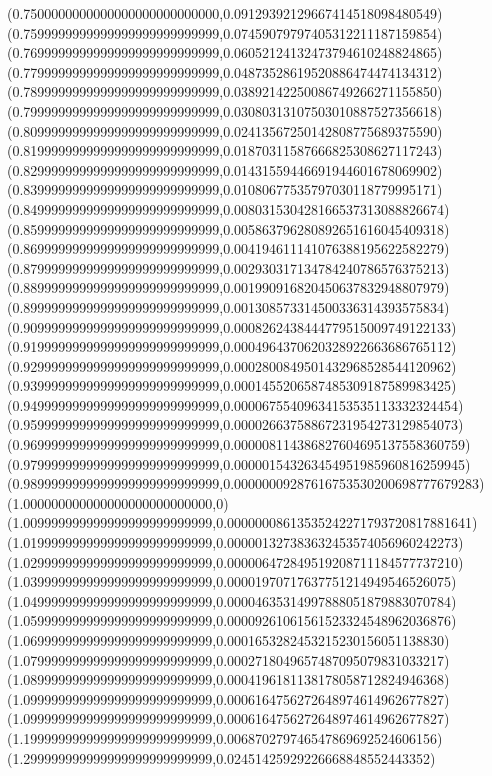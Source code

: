 \documentclass[11pt]{report}
\begin{document}
\begin{center}
  (0.7500000000000000000000000000,0.09129392129667414518098480549)
  (0.7599999999999999999999999999,0.07459079797405312211187159854)
  (0.7699999999999999999999999999,0.06052124132473794610248824865)
  (0.7799999999999999999999999999,0.04873528619520886474474134312)
  (0.7899999999999999999999999999,0.03892142250086749266271155850)
  (0.7999999999999999999999999999,0.03080313107503010887527356618)
  (0.8099999999999999999999999999,0.02413567250142808775689375590)
  (0.8199999999999999999999999999,0.01870311587666825308627117243)
  (0.8299999999999999999999999999,0.01431559446691944601678069902)
  (0.8399999999999999999999999999,0.01080677535797030118779995171)
  (0.8499999999999999999999999999,0.008031530428166537313088826674)
  (0.8599999999999999999999999999,0.005863796280892651616045409318)
  (0.8699999999999999999999999999,0.004194611141076388195622582279)
  (0.8799999999999999999999999999,0.002930317134784240786576375213)
  (0.8899999999999999999999999999,0.001990916820450637832948807979)
  (0.8999999999999999999999999999,0.001308573314500336314393575834)
  (0.9099999999999999999999999999,0.0008262438444779515009749122133)
  (0.9199999999999999999999999999,0.0004964370620328922663686765112)
  (0.9299999999999999999999999999,0.0002800849501432968528544120962)
  (0.9399999999999999999999999999,0.0001455206587485309187589983425)
  (0.9499999999999999999999999999,0.00006755409634153535113332324454)
  (0.9599999999999999999999999999,0.00002663758867231954273129854073)
  (0.9699999999999999999999999999,0.000008114386827604695137558360759)
  (0.9799999999999999999999999999,0.000001543263454951985960816259945)
  (0.9899999999999999999999999999,0.00000009287616753530200698777679283)
  (1.000000000000000000000000000,0)
  (1.009999999999999999999999999,0.00000008613535242271793720817881641)
  (1.019999999999999999999999999,0.000001327383632453574056960242273)
  (1.029999999999999999999999999,0.000006472849519208711184577737210)
  (1.039999999999999999999999999,0.00001970717637751214949546526075)
  (1.049999999999999999999999999,0.00004635314997888051879883070784)
  (1.059999999999999999999999999,0.00009261061561523324548962036876)
  (1.069999999999999999999999999,0.0001653282453215230156051138830)
  (1.079999999999999999999999999,0.0002718049657487095079831033217)
  (1.089999999999999999999999999,0.0004196181138178058712824946368)
  (1.099999999999999999999999999,0.0006164756272648974614962677827)
  (1.099999999999999999999999999,0.0006164756272648974614962677827)
  (1.199999999999999999999999999,0.006870279746547869692524606156)
  (1.299999999999999999999999999,0.02451425929226668848552443352)

\end{center}
\end{document}
